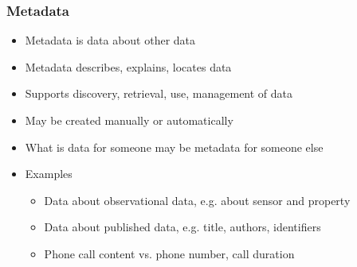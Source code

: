 \documentclass{beamer}
\begin{document}
\begin{frame}
  \frametitle{Metadata}
  
  \begin{itemize}
  \item Metadata is data about other data
  \item Metadata describes, explains, locates data
  \item Supports discovery, retrieval, use, management of data
  \item May be created manually or automatically
  \item What is data for someone may be metadata for someone else
  \item Examples
  \begin{itemize}
    \item Data about observational data, e.g. about sensor and property
    \item Data about published data, e.g. title, authors, identifiers
    \item Phone call content vs. phone number, call duration
  \end{itemize}
  \end{itemize}
\end{frame}
\end{document}

